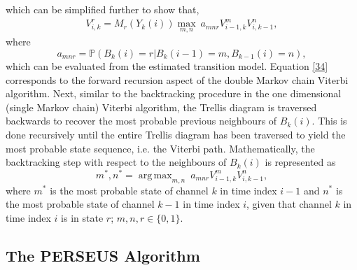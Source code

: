 \documentclass[10pt,twocolumn]{IEEEtran}
\DeclareMathOperator*{\argmax}{arg\,max}
\begin{document}
which can be simplified further to show that,
\begin{equation}\label{34}
    \begin{aligned}
        V_{i,k}^{r} = M_r(Y_k(i))\max_{m,n}\ a_{mnr}V_{i-1,k}^{m}V_{i,k-1}^{n},
    \end{aligned}
\end{equation}
where
\begin{equation}\label{35}
    a_{mnr} = \mathbb{P}(B_k(i)=r|B_{k}(i-1)=m,B_{k-1}(i)=n),
\end{equation}
which can be evaluated from the estimated transition model. Equation \eqref{34} corresponds to the forward recursion aspect of the double Markov chain Viterbi algorithm. Next, similar to the backtracking procedure in the one dimensional (single Markov chain) Viterbi algorithm, the Trellis diagram is traversed backwards to recover the most probable previous neighbours of $B_k(i)$. This is done recursively until the entire Trellis diagram has been traversed to yield the most probable state sequence, i.e. the Viterbi path. Mathematically, the backtracking step with respect to the neighbours of $B_k(i)$ is represented as
\begin{equation}\label{36}
    m^*, n^* = \argmax_{m,n}\ a_{mnr}V_{i-1,k}^{m}V_{i,k-1}^{n},
\end{equation}
where $m^*$ is the most probable state of channel $k$ in time index $i-1$ and $n^*$ is the most probable state of channel $k-1$ in time index $i$, given that channel $k$ in time index $i$ is in state $r$; $m, n, r \in \{0,1\}$.
\subsection{The PERSEUS Algorithm}
\end{document}
